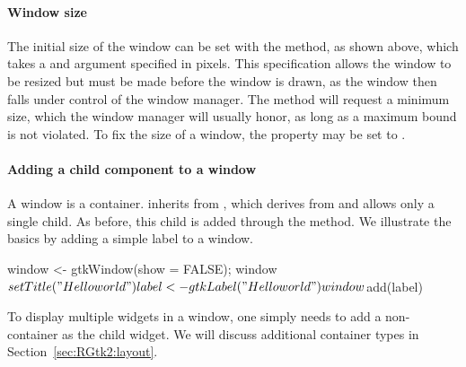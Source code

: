 \paragraph{Window size}
The initial size of the window can be set with the
 method, as shown above, which takes a
 and  argument
specified in pixels. This specification allows the window to be
resized but must be made before the window is drawn, as the window
then falls under control of the window manager. The
 method will request a minimum size,
which the window manager will usually honor, as long as a maximum
bound is not violated. To fix the size of a window, the
 property may be set to .

\paragraph{Adding a child component to a window}
A window is a container.  inherits from
, which derives from  and allows
only a single child. As before, this child is added through the
 method. 
We illustrate the basics by adding a simple label to a window.
\begin{Schunk}
\begin{Sinput}
 window <- gtkWindow(show = FALSE); window$setTitle("Hello world")
 label <- gtkLabel("Hello world")
 window$add(label)
\end{Sinput}
\end{Schunk}
%
To display multiple widgets in a window, one simply needs to add a
non- container as the child widget. We will discuss
additional container types in Section~\ref{sec:RGtk2:layout}.

